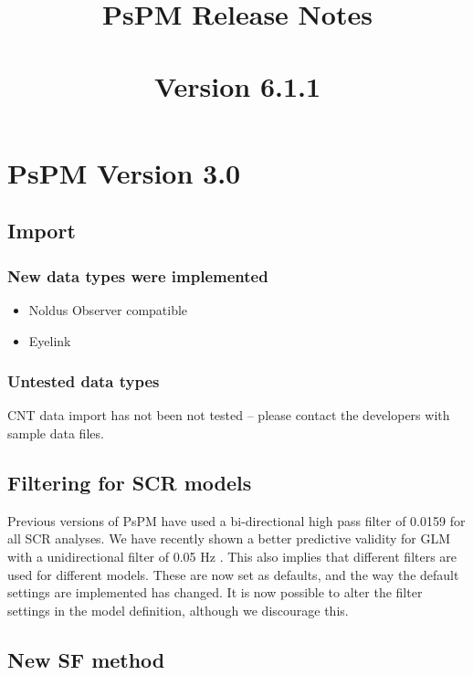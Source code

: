 \documentclass[english]{article}
\title{PsPM Release Notes\\ ~\\ Version 6.1.1}
\numberwithin{equation}{section}
\numberwithin{figure}{section}
\begin{document}
\maketitle
\date
\pagebreak


\tableofcontents{}
\pagebreak

\section{PsPM Version 3.0}

\subsection*{Import}

\subsubsection*{New data types were implemented}
\begin{itemize}
\item Noldus Observer compatible 
\item Eyelink
\end{itemize}

\subsubsection*{Untested data types}

CNT data import has not been not tested -- please contact the developers
with sample data files. 

\subsection*{Filtering for SCR models}

Previous versions of PsPM have used a bi-directional high pass filter
of 0.0159 for all SCR analyses. We have recently shown a better predictive
validity for GLM with a unidirectional filter of 0.05 Hz \cite{Bach:2013aa}.
This also implies that different filters are used for different models.
These are now set as defaults, and the way the default settings are
implemented has changed. It is now possible to alter the filter settings
in the model definition, although we discourage this.

\subsection*{New SF method}
\end{document}
